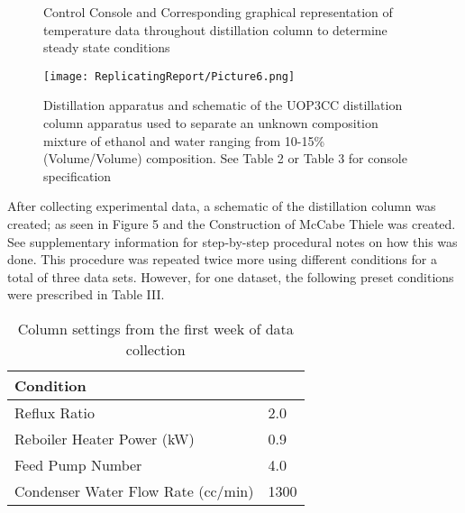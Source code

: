 \documentclass[peerreview, a4paper, 12pt]{IEEEtran}
\begin{document}
\begin{figure}[]
    \centering
    \hspace{1em}
    \caption{Control Console and Corresponding graphical representation of temperature data throughout distillation column to determine steady state conditions}
    \label{fig1}
\end{figure}

\begin{figure}
    \centering
   \texttt{[image: ReplicatingReport/Picture6.png]}
    \caption{Distillation apparatus and schematic of the UOP3CC distillation column apparatus used to separate an unknown composition mixture of ethanol and water ranging from 10-15\% (Volume/Volume) composition. See Table 2 or Table 3 for console specification}
\end{figure}
After collecting experimental data, a schematic of the distillation column was created; as seen in Figure 5 and the Construction of McCabe Thiele was created. See supplementary information for step-by-step procedural notes on how this was done. This procedure was repeated twice more using different conditions for a total of three data sets. However, for one dataset, the following preset conditions were prescribed in Table III.

\begin{center}
    \begin{table}
    \centering            
    \caption{Column settings from the first week of data collection}
    {\tabulinesep =1.2mm
    \begin{tabu} {|p{2in}|p{0.5in}|}
    \hline
    Condition & \\
    \hline
    Reflux Ratio & 2.0 \\
    \hline
    Reboiler Heater Power (kW) & 0.9\\
    \hline
    Feed Pump Number & 4.0\\
    \hline
    Condenser Water Flow Rate (cc/min) & 1300\\
    \hline       
    \end{tabu}}
    \end{table}
\end{center}
\end{document}
